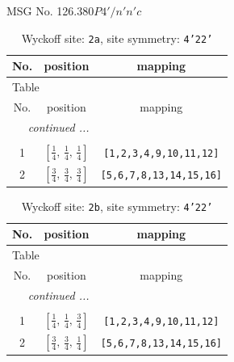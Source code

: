 \documentclass[fleqn,8pt]{jsarticle}
\begin{document}
\setcounter{MaxMatrixCols}{32}

\renewcommand{\tablename}{Table~}
\renewcommand{\figurename}{Figure~}
\begin{center}
\LARGE
MSG No. 126.380\quad$P4'/n'n'c$
\end{center}
\renewcommand{\arraystretch}{1.2}
\begin{longtable}{ccc}
\caption{Wyckoff site: {\tt 2a}, site symmetry: {\tt 4'22'}}
 \\
 \hline \hline
No. & position & mapping \\ \hline \endfirsthead

\multicolumn{2}{l}{\tablename\ \thetable{}} \\
 \hline \hline
No. & position & mapping \\ \hline \endhead

 \hline \hline
\multicolumn{2}{r}{\footnotesize\it continued ...} \\ \endfoot

 \hline \hline
\multicolumn{2}{r}{} \\ \endlastfoot

1 & $\left[ \frac{1}{4},\, \frac{1}{4},\, \frac{1}{4} \right]$ & {\tt [1,2,3,4,9,10,11,12]} \\ \hline
2 & $\left[ \frac{3}{4},\, \frac{3}{4},\, \frac{3}{4} \right]$ & {\tt [5,6,7,8,13,14,15,16]} \\
\end{longtable}
\renewcommand{\arraystretch}{1.2}
\begin{longtable}{ccc}
\caption{Wyckoff site: {\tt 2b}, site symmetry: {\tt 4'22'}}
 \\
 \hline \hline
No. & position & mapping \\ \hline \endfirsthead

\multicolumn{2}{l}{\tablename\ \thetable{}} \\
 \hline \hline
No. & position & mapping \\ \hline \endhead

 \hline \hline
\multicolumn{2}{r}{\footnotesize\it continued ...} \\ \endfoot

 \hline \hline
\multicolumn{2}{r}{} \\ \endlastfoot

1 & $\left[ \frac{1}{4},\, \frac{1}{4},\, \frac{3}{4} \right]$ & {\tt [1,2,3,4,9,10,11,12]} \\ \hline
2 & $\left[ \frac{3}{4},\, \frac{3}{4},\, \frac{1}{4} \right]$ & {\tt [5,6,7,8,13,14,15,16]} \\
\end{longtable}
\end{document}
